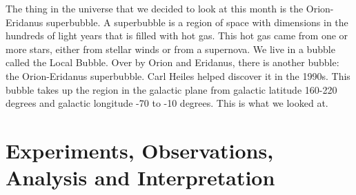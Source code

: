 \documentclass[11pt]{article}
\begin{document}
The thing in the universe that we decided to look at this month is the Orion-Eridanus superbubble. A superbubble is a region of space with dimensions in the hundreds of light years that is filled with hot gas. This hot gas came from one or more stars, either from stellar winds or from a supernova. We live in a bubble called the Local Bubble. Over by Orion and Eridanus, there is another bubble: the Orion-Eridanus superbubble. Carl Heiles helped discover it in the 1990s. This bubble takes up the region in the galactic plane from galactic latitude 160-220 degrees and galactic longitude -70 to -10 degrees. This is what we looked at.  

\section{Experiments, Observations, Analysis and Interpretation}
\end{document}

